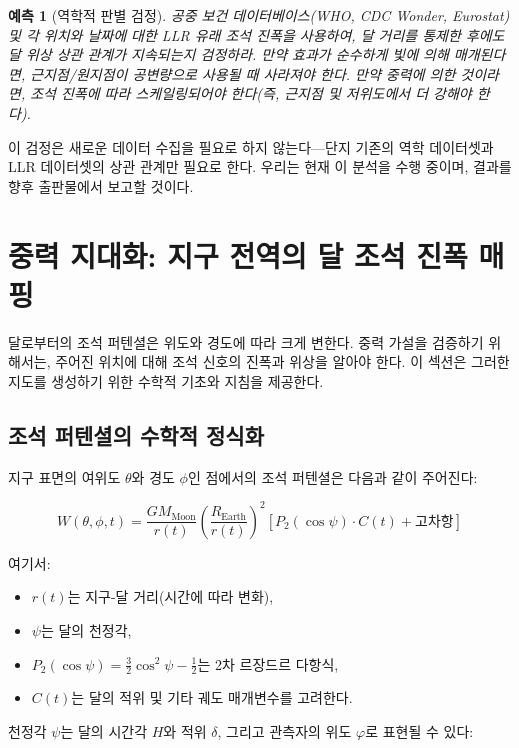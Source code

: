 \documentclass[12pt,a4paper]{article}
\newtheorem{prediction}[theorem]{예측}
\theoremstyle{remark}
\begin{document}
	\begin{prediction}[역학적 판별 검정]
		공중 보건 데이터베이스(WHO, CDC Wonder, Eurostat) 및 각 위치와 날짜에 대한 LLR 유래 조석 진폭을 사용하여, 달 거리를 통제한 후에도 달 위상 상관 관계가 지속되는지 검정하라. 만약 효과가 순수하게 빛에 의해 매개된다면, 근지점/원지점이 공변량으로 사용될 때 사라져야 한다. 만약 중력에 의한 것이라면, 조석 진폭에 따라 스케일링되어야 한다(즉, 근지점 및 저위도에서 더 강해야 한다).
	\end{prediction}
	
	이 검정은 새로운 데이터 수집을 필요로 하지 않는다—단지 기존의 역학 데이터셋과 LLR 데이터셋의 상관 관계만 필요로 한다. 우리는 현재 이 분석을 수행 중이며, 결과를 향후 출판물에서 보고할 것이다.
	
	\section{중력 지대화: 지구 전역의 달 조석 진폭 매핑}
	\label{sec:map}
	
	달로부터의 조석 퍼텐셜은 위도와 경도에 따라 크게 변한다. 중력 가설을 검증하기 위해서는, 주어진 위치에 대해 조석 신호의 진폭과 위상을 알아야 한다. 이 섹션은 그러한 지도를 생성하기 위한 수학적 기초와 지침을 제공한다.
	
	\subsection{조석 퍼텐셜의 수학적 정식화}
	
	지구 표면의 여위도 $\theta$와 경도 $\phi$인 점에서의 조석 퍼텐셜은 다음과 같이 주어진다:
	
	\begin{equation}
		W(\theta, \phi, t) = \frac{GM_{\text{Moon}}}{r(t)} \left(\frac{R_{\text{Earth}}}{r(t)}\right)^2 \left[ P_2(\cos\psi) \cdot C(t) + \text{고차항} \right]
		\label{eq:tidal-full-map}
	\end{equation}
	
	여기서:
	\begin{itemize}
		\item $r(t)$는 지구-달 거리(시간에 따라 변화),
		\item $\psi$는 달의 천정각,
		\item $P_2(\cos\psi) = \frac{3}{2}\cos^2\psi - \frac{1}{2}$는 2차 르장드르 다항식,
		\item $C(t)$는 달의 적위 및 기타 궤도 매개변수를 고려한다.
	\end{itemize}
	
	천정각 $\psi$는 달의 시간각 $H$와 적위 $\delta$, 그리고 관측자의 위도 $\varphi$로 표현될 수 있다:
	
\end{document}
